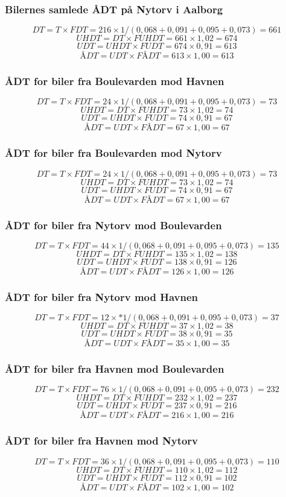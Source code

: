 \subsubsection{Bilernes samlede ÅDT på Nytorv i Aalborg}
$$DT = T \times FDT = 216 \times 1/(0,068+0,091+0,095+0,073) = 661$$
$$UHDT = DT \times FUHDT = 661 \times 1,02 = 674$$
$$UDT = UHDT \times FUDT = 674 \times 0,91 = 613$$
$$ÅDT = UDT \times FÅDT = 613 \times 1,00 = 613$$
\subsubsection{ÅDT for biler fra Boulevarden mod Havnen}
$$DT = T \times FDT = 24 \times 1/(0,068+0,091+0,095+0,073) = 73$$
$$UHDT = DT \times FUHDT = 73 \times 1,02 = 74$$
$$UDT = UHDT \times FUDT = 74 \times 0,91 = 67$$
$$ÅDT = UDT \times FÅDT = 67 \times 1,00 = 67$$
\subsubsection{ÅDT for biler fra Boulevarden mod Nytorv}
$$DT = T \times FDT = 24 \times 1/(0,068+0,091+0,095+0,073) = 73$$
$$UHDT = DT \times FUHDT = 73 \times 1,02 = 74$$
$$UDT = UHDT \times FUDT = 74 \times 0,91 = 67$$
$$ÅDT = UDT \times FÅDT = 67 \times 1,00 = 67$$
\subsubsection{ÅDT for biler fra Nytorv mod Boulevarden}
$$DT = T \times FDT = 44 \times 1/(0,068+0,091+0,095+0,073) = 135$$
$$UHDT = DT \times FUHDT = 135 \times 1,02 = 138$$
$$UDT = UHDT \times FUDT = 138 \times 0,91 = 126$$
$$ÅDT = UDT \times FÅDT = 126 \times 1,00 = 126$$
\subsubsection{ÅDT for biler fra Nytorv mod Havnen}
$$DT = T \times FDT = 12 \times* 1/(0,068+0,091+0,095+0,073) = 37$$
$$UHDT = DT \times FUHDT = 37 \times 1,02 = 38$$
$$UDT = UHDT \times FUDT = 38 \times 0,91 = 35$$
$$ÅDT = UDT \times FÅDT = 35 \times 1,00 = 35$$
\subsubsection{ÅDT for biler fra Havnen mod Boulevarden}
$$DT = T \times FDT = 76 \times 1/(0,068+0,091+0,095+0,073) = 232$$
$$UHDT = DT \times FUHDT = 232 \times 1,02 = 237$$
$$UDT = UHDT \times FUDT = 237 \times 0,91 = 216$$
$$ÅDT = UDT \times FÅDT = 216 \times 1,00 = 216$$
\subsubsection{ÅDT for biler fra Havnen mod Nytorv}
$$DT = T \times FDT = 36 \times 1/(0,068+0,091+0,095+0,073) = 110$$
$$UHDT = DT \times FUHDT = 110 \times 1,02 = 112$$
$$UDT = UHDT \times FUDT = 112 \times 0,91 = 102$$
$$ÅDT = UDT \times FÅDT = 102 \times 1,00 = 102$$














